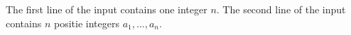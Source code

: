 The first line of the input contains one integer $n$.
The second line of the input contains $n$ positie integers $a_1,\dots,a_n$.

